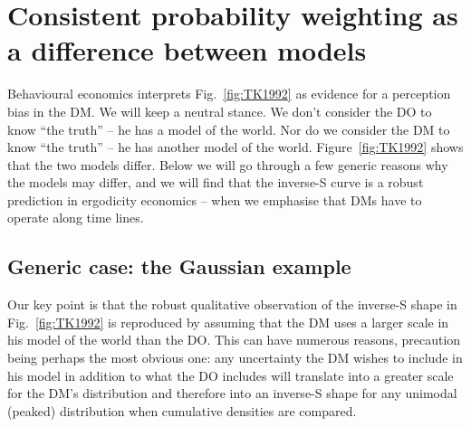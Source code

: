 \documentclass[%
	11pt,
	abstract=true,	
	bibliography=oldstyle					%
]{scrartcl}
\newcommand{\seclabel}[1]{\label{sec:#1}}
\newcommand{\fref}[1]{Fig.~\ref{fig:#1}}
\newcommand{\Fref}[1]{Figure~\ref{fig:#1}}
\numberwithin{equation}{section}
\begin{document}
%
%

\section{Consistent probability weighting as a difference between models} \seclabel{ModelDiff}

Behavioural economics interprets \fref{TK1992} as evidence for a perception bias in the DM. We will keep a neutral stance. We don't consider the DO to know ``the truth'' -- he has a model of the world. Nor do we consider the DM to know ``the truth'' -- he has another model of the world. \Fref{TK1992} shows that the two models differ. Below we will go through a few generic reasons why the models may differ, and we will find that the inverse-S curve is a robust prediction in ergodicity economics -- when we emphasise that DMs have to operate along time lines.


\subsection{Generic case: the Gaussian example}
Our key point is that the robust qualitative observation of the inverse-S shape in \fref{TK1992} is reproduced by assuming that the DM uses a larger scale in his model of the world than the DO. This can have numerous reasons, precaution being perhaps the most obvious one: any uncertainty the DM wishes to include in his model in addition to what the DO includes will translate into a greater scale for the DM's distribution and therefore into an inverse-S shape for any unimodal (peaked) distribution when cumulative densities are compared.
\end{document}

